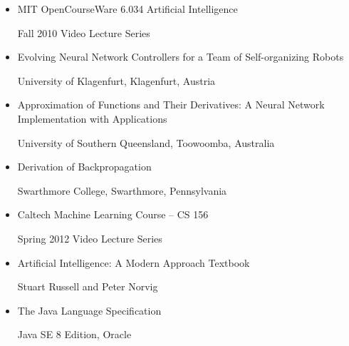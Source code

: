 \documentclass[letterpaper, 10pt]{article}
\begin{document}
	\begin{itemize}
		\item MIT OpenCourseWare 6.034 Artificial Intelligence
		
			\hspace{1.5cm} Fall 2010 Video Lecture Series
		\item Evolving Neural Network Controllers for a Team of Self-organizing Robots
		
			\hspace{1.5cm} University of Klagenfurt, Klagenfurt, Austria
		\item Approximation of Functions and Their Derivatives: A Neural Network Implementation with Applications
		
			\hspace{1.5cm} University of Southern Queensland, Toowoomba, Australia
		\item Derivation of Backpropagation
		
			\hspace{1.5cm} Swarthmore College, Swarthmore, Pennsylvania
		\item Caltech Machine Learning Course -- CS 156
		
			\hspace{1.5cm} Spring 2012 Video Lecture Series
		\item Artificial Intelligence: A Modern Approach Textbook
			
			\hspace{1.5cm} Stuart Russell and Peter Norvig
		\item The Java Language Specification
			
			\hspace{1.5cm} Java SE 8 Edition, Oracle
	\end{itemize}
\end{document}

